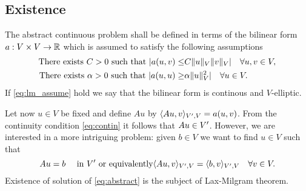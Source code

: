 \subsection{Existence}
  The abstract continuous problem shall be defined in terms of the bilinear form
  $a:V\times V\rightarrow \mathbb{R}$ which is assumed to satisfy the following
  assumptions
  \begin{subequations}\label{eq:lm_assume}
  \begin{align}
    \label{eq:contin}
    \mbox{There exists } C > 0 \mbox{ such that } \lvert a(u, v)\leq &C\lVert u\rVert_V\lVert v\rVert_V\rvert
    \quad\forall u, v\in V, \\
    \label{eq:coerc}
    \mbox{There exists }\alpha > 0 \mbox{ such that } \lvert a(u, u)\geq &\alpha\lVert u\rVert^2_V\rvert
    \quad\forall u\in V.
  \end{align}
  \end{subequations}
  If \eqref{eq:lm_assume} hold we say that the bilinear form is continous and
  $V$-elliptic.

  Let now $u\in V$ be fixed and define $Au$ by $\langle Au, v\rangle_{V^{\prime}, V}=a(u, v)$. 
  From the continuity condition \eqref{eq:contin} it follows that
  $Au\in V^{\prime}$. However, we are interested in a more intriguing problem: given
  $b\in V$ we want to find $u\in V$ such that
  \begin{equation}\label{eq:abstract}
    Au = b\quad\mbox{ in }V^{\prime}
    \mbox{ or equivalently}
    \langle Au, v\rangle_{V^{\prime}, V} = \langle b, v\rangle_{V^{\prime}, V}\quad\forall v\in V.
  \end{equation}
  Existence of solution of \eqref{eq:abstract} is the subject of Lax-Milgram
  theorem.

